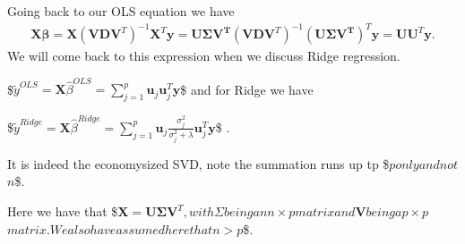 \documentclass[letterpaper,10pt,english]{sphinxmanual}
\begin{document}
Going back to our OLS equation we have
\begin{equation*}
\begin{split}
\boldsymbol{X}\boldsymbol{\beta} = \boldsymbol{X}\left(\boldsymbol{V}\boldsymbol{D}\boldsymbol{V}^T \right)^{-1}\boldsymbol{X}^T\boldsymbol{y}=\boldsymbol{U\Sigma V^T}\left(\boldsymbol{V}\boldsymbol{D}\boldsymbol{V}^T \right)^{-1}(\boldsymbol{U\Sigma V^T})^T\boldsymbol{y}=\boldsymbol{U}\boldsymbol{U}^T\boldsymbol{y}.
\end{split}
\end{equation*}
We will come back to this expression when we discuss Ridge regression.

\$\( \tilde{y}^{OLS}=\boldsymbol{X}\hat{\beta}^{OLS}=\sum_{j=1}^p \boldsymbol{u}_j\boldsymbol{u}_j^T\boldsymbol{y}\)\$ and for Ridge we have

\$\( \tilde{y}^{Ridge}=\boldsymbol{X}\hat{\beta}^{Ridge}=\sum_{j=1}^p \boldsymbol{u}_j\frac{\sigma_j^2}{\sigma_j^2+\lambda}\boldsymbol{u}_j^T\boldsymbol{y}\)\$ .

It is indeed the economy\sphinxhyphen{}sized SVD, note the summation runs up tp \$\(p\)\( only and not \)\(n\)\$.

Here we have that \$\(\boldsymbol{X} = \boldsymbol{U}\boldsymbol{\Sigma}\boldsymbol{V}^T\)\(, with \)\(\Sigma\)\( being an \)\( n\times p\)\( matrix and \)\(\boldsymbol{V}\)\( being a \)\( p\times p\)\( matrix. We also have assumed here that \)\( n > p\)\$.
\end{document}
